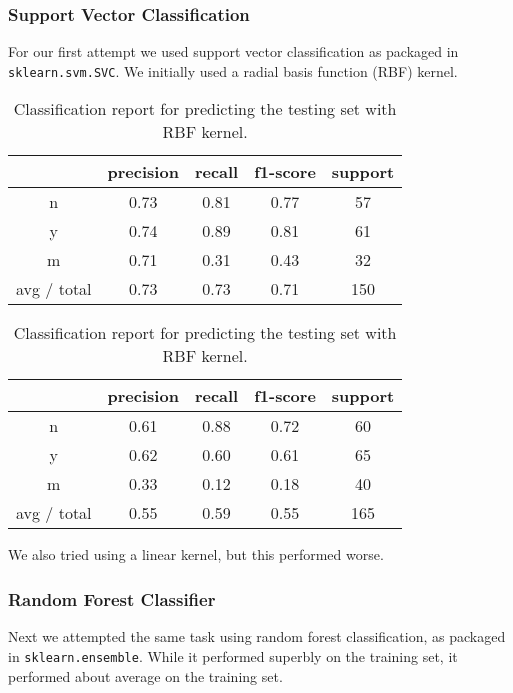 \documentclass[11pt]{article}
\begin{document}
\subsubsection{Support Vector Classification}
\label{sec:svc}
For our first attempt we used support vector classification as
packaged in \verb|sklearn.svm.SVC|.  We initially used a radial basis
function (RBF) kernel.
\begin{table}
  \centering
  \begin{tabular}[!htbp]{c|c c c c}
                & precision &recall &f1-score &support \\ \hline
    n           & 0.73      &0.81   &0.77     &57      \\
    y           & 0.74      &0.89   &0.81     &61      \\
    m           & 0.71      &0.31   &0.43     &32      \\ \hline
    avg / total & 0.73      &0.73   &0.71     &150     \\
  \end{tabular}
  \caption{Reconstructing the training set (150 flares total) with RBF kernel.}

  \begin{tabular}[!htbp]{c|c c c c}
                & precision &recall &f1-score &support \\ \hline
    n           & 0.61      &0.88   &0.72     &60      \\
    y           & 0.62      &0.60   &0.61     &65      \\
    m           & 0.33      &0.12   &0.18     &40      \\ \hline
    avg / total & 0.55      &0.59   &0.55     &165     \\
  \end{tabular}
  \caption{Classification report for predicting the testing set
    with RBF kernel.}
\end{table}

We also tried using a linear kernel, but this performed worse.

\subsubsection{Random Forest Classifier}
\label{sec:randfor}
Next we attempted the same task using random forest classification,
as packaged in \verb|sklearn.ensemble|.  While it performed superbly
on the training set, it performed about average on the training set.
\end{document}
